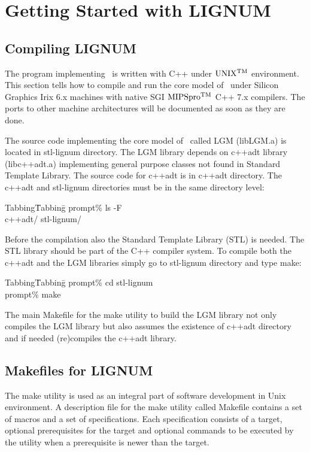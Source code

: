 \chapter{Getting Started with LIGNUM}

\section{Compiling LIGNUM}

The  program implementing  \lignum\  is written  with  C++ under  $\rm
UNIX^{TM}$ environment. This section tells  how to compile and run the
core model of  \lignum\ under Silicon Graphics Irix  6.x machines with
native SGI $ \rm MIPSpro^{TM}$  C++ 7.x compilers.  The ports to other
machine architectures will be documented as soon as they are done.

The source  code implementing  the core model  of \lignum\  called LGM
(libLGM.a) is located in stl-lignum directory. The LGM library depends
on c++adt  library (libc++adt.a) implementing  general purpose classes
not found in Standard Template Library.  The source code for c++adt is
in c++adt directory. The c++adt  and stl-lignum directories must be in
the same directory level:

\begin{tabbing}
Tabbing\= Tabbing\=\kill
\>\>prompt\% ls -F \\
\>\>c++adt/ stl-lignum/
\end{tabbing}

Before  the compilation also  the Standard  Template Library  (STL) is
needed. The STL library should be part of the C++ compiler system.  To
compile both the c++adt and  the LGM libraries simply go to stl-lignum
directory and type make:

\begin{tabbing}
Tabbing\= Tabbing\=\kill
\>\>prompt\% cd stl-lignum \\
\>\>prompt\% make
\end{tabbing}

The main  Makefile for the make  utility to build the  LGM library not
only compiles the LGM library but also assumes the existence of c++adt
directory and if needed (re)compiles the c++adt library.

\section{Makefiles for LIGNUM}

The make utility  is used as an integral  part of software development
in Unix environment.   A description file for the  make utility called
Makefile contains  a set of macros  and a set  of specifications. Each
specification  consists of  a target,  optional prerequisites  for the
target  and optional commands  to be  executed by  the utility  when a
prerequisite is newer than the target.

